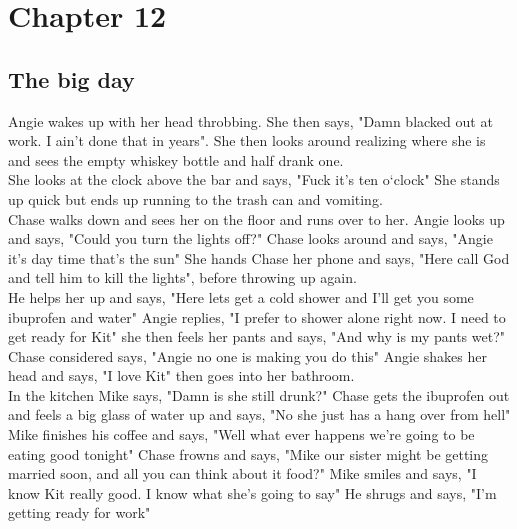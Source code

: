 \documentclass{article}[12px]
\begin{document}
\section* {Chapter 12}
\subsection* {The big day}
	Angie wakes up with her head throbbing. She then says, "Damn blacked out at work. I ain't done that in years". She then looks around realizing where she is and sees the empty whiskey bottle and half drank one.\\

	She looks at the clock above the bar and says, "Fuck it's ten o`clock" She stands up quick but ends up running to the trash can and vomiting.\\

	Chase walks down and sees her on the floor and runs over to her. Angie looks up and says, "Could you turn the lights off?" Chase looks around and says, "Angie it's day time that's the sun" She hands Chase her phone and says, "Here call God and tell him to kill the lights", before throwing up again.\\

	He  helps her up and says, "Here lets get a cold shower and I'll get you some ibuprofen and water" Angie replies, "I prefer to shower alone right now. I need to get ready for Kit" she then feels her pants and says, "And why is my pants wet?" Chase considered says, "Angie no one is making you do this" Angie shakes her head and says, "I love Kit" then goes into her bathroom.\\

	In the kitchen Mike says, "Damn is she still drunk?" Chase gets the ibuprofen out and feels a big glass of water up and says, "No she just has a hang over from hell" Mike finishes his coffee and says, "Well what ever happens we're going to be eating good tonight" Chase frowns and says, "Mike our sister might be getting married soon, and all you can think about it food?" Mike smiles and says, "I know Kit really good. I know what she's going to say" He shrugs and says, "I'm getting ready for work"\\
\end{document}

